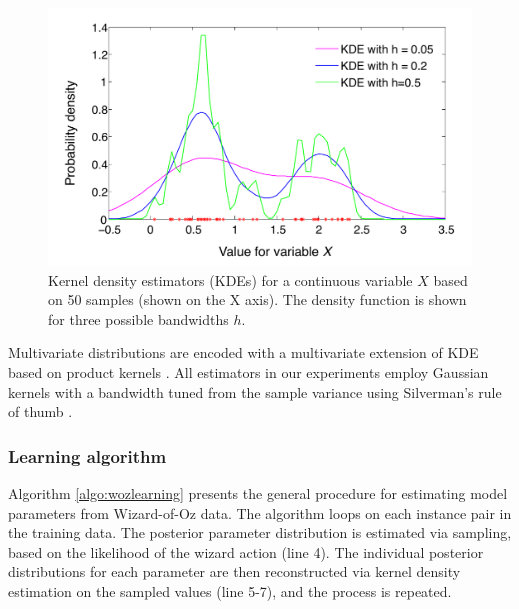 \begin{figure}[ht]
\centering
\includegraphics[scale=0.45]{imgs/kde.pdf} 
\caption{Kernel density estimators (KDEs) for a continuous variable $X$ based on 50 samples (shown on the X axis). The density function is shown for three possible bandwidths $h$. }
\label{fig:kde}
\end{figure}

Multivariate distributions are encoded with a multivariate extension of KDE based on product kernels \citep{Silverman1986}.  All estimators in our experiments employ Gaussian kernels with a bandwidth tuned from the sample variance using Silverman's rule of thumb \citep{Silverman1986}. 


\subsubsection*{Learning algorithm}

Algorithm \ref{algo:wozlearning} presents the general procedure for estimating model parameters from Wizard-of-Oz data.  The algorithm loops on each instance pair in the training data.   The posterior parameter distribution is estimated via sampling, based on the likelihood of the wizard action (line 4).  The individual posterior distributions for each parameter are then reconstructed via kernel density estimation on the sampled values (line 5-7), and the process is repeated. 


